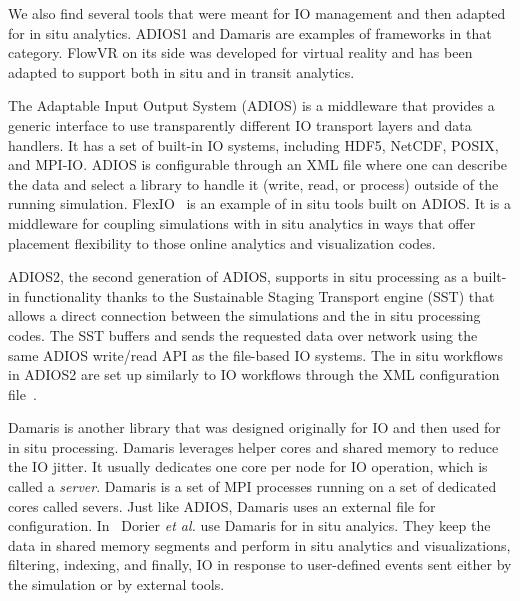 We also find several tools that were meant for IO management and then adapted for in situ analytics. ADIOS1\cite{lofstead_insights_2013_adios, jin2008adaptive_adios, boyuka_transparent_2014_adios, in_situ_methodes} and Damaris\cite{dorier_damaris_2012} 
are examples of frameworks in that category. FlowVR\cite{dreher_flexible_2014} on its side was developed for virtual reality and has been adapted to support both in situ and in transit analytics.

The Adaptable Input Output System (ADIOS) is a middleware that provides a generic interface to use transparently different IO transport layers and data handlers.
It has a set of built-in IO systems, including HDF5, NetCDF, POSIX, and MPI-IO.
ADIOS is configurable through an XML file where one can describe the data and select a library to handle it (write, read, or process) outside of the running simulation. 
FlexIO~\cite{zheng_flexio_nodate} is an example of in situ tools built on ADIOS. It is a middleware for coupling simulations with in situ analytics in ways that offer placement flexibility to those online analytics and visualization codes. 

ADIOS2,  the second generation of ADIOS, supports in situ processing as a built-in functionality thanks to the  Sustainable Staging Transport engine (SST) that allows a direct connection between the simulations and the in situ processing codes. The SST buffers and sends the requested data over network using the same ADIOS write/read API as the file-based IO systems. The in situ workflows in ADIOS2 are set up similarly to IO workflows through the XML configuration file~\cite{laufer2022high_adios2_insitu}.

Damaris\cite{dorier_damaris_2012, dorier_damaris_2012_tech_report} is another library that was designed originally for IO and then used for in situ processing. Damaris leverages helper cores and shared memory to reduce the IO jitter. It usually dedicates one core per node for IO operation, which is called a \textit{server}. 
Damaris is a set of MPI processes running on a set of dedicated cores called severs. Just like ADIOS, Damaris uses an external file for configuration. In~\cite{dorier_addressing_2014, dorier_lessons_2015, dorier_damaris, damaris_viz} Dorier \textit{et al.} use Damaris for in situ analyics. They keep the data in shared memory segments and perform in situ analytics and visualizations, filtering, indexing, and finally, IO in response to user-defined events sent either by the simulation or by external tools.  

